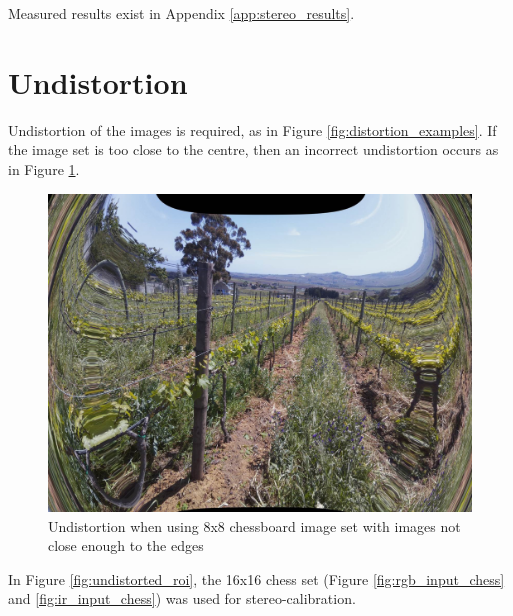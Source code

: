 Measured results exist in Appendix \ref{app:stereo_results}.

\section{Undistortion}
\label{sec:undistortion}

Undistortion of the images is required, as in Figure \ref{fig:distortion_examples}. If the image set is too close to the centre, then an incorrect undistortion occurs as in Figure \ref{fig:incorrectly_undistorted}.

\begin{figure}[H]
\centering
\includegraphics[scale=0.25]{images/incorrectly_undistorted.jpg}
\caption{Undistortion when using 8x8 chessboard image set with images not close enough to the edges}
\label{fig:incorrectly_undistorted}
\end{figure}

In Figure \ref{fig:undistorted_roi}, the 16x16 chess set (Figure \ref{fig:rgb_input_chess} and \ref{fig:ir_input_chess}) was used for stereo-calibration.

